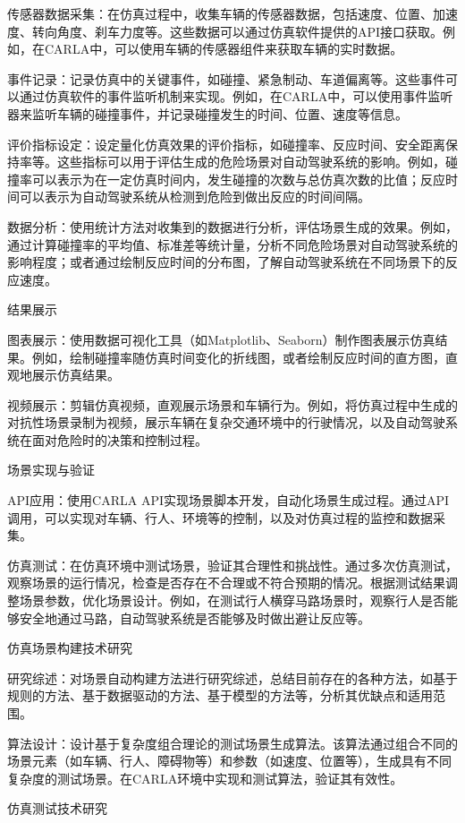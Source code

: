 传感器数据采集：在仿真过程中，收集车辆的传感器数据，包括速度、位置、加速度、转向角度、刹车力度等。这些数据可以通过仿真软件提供的API接口获取。例如，在CARLA中，可以使用车辆的传感器组件来获取车辆的实时数据。

事件记录：记录仿真中的关键事件，如碰撞、紧急制动、车道偏离等。这些事件可以通过仿真软件的事件监听机制来实现。例如，在CARLA中，可以使用事件监听器来监听车辆的碰撞事件，并记录碰撞发生的时间、位置、速度等信息。

评价指标设定：设定量化仿真效果的评价指标，如碰撞率、反应时间、安全距离保持率等。这些指标可以用于评估生成的危险场景对自动驾驶系统的影响。例如，碰撞率可以表示为在一定仿真时间内，发生碰撞的次数与总仿真次数的比值；反应时间可以表示为自动驾驶系统从检测到危险到做出反应的时间间隔。

数据分析：使用统计方法对收集到的数据进行分析，评估场景生成的效果。例如，通过计算碰撞率的平均值、标准差等统计量，分析不同危险场景对自动驾驶系统的影响程度；或者通过绘制反应时间的分布图，了解自动驾驶系统在不同场景下的反应速度。

结果展示

图表展示：使用数据可视化工具（如Matplotlib、Seaborn）制作图表展示仿真结果。例如，绘制碰撞率随仿真时间变化的折线图，或者绘制反应时间的直方图，直观地展示仿真结果。

视频展示：剪辑仿真视频，直观展示场景和车辆行为。例如，将仿真过程中生成的对抗性场景录制为视频，展示车辆在复杂交通环境中的行驶情况，以及自动驾驶系统在面对危险时的决策和控制过程。

场景实现与验证

API应用：使用CARLA API实现场景脚本开发，自动化场景生成过程。通过API调用，可以实现对车辆、行人、环境等的控制，以及对仿真过程的监控和数据采集。

仿真测试：在仿真环境中测试场景，验证其合理性和挑战性。通过多次仿真测试，观察场景的运行情况，检查是否存在不合理或不符合预期的情况。根据测试结果调整场景参数，优化场景设计。例如，在测试行人横穿马路场景时，观察行人是否能够安全地通过马路，自动驾驶系统是否能够及时做出避让反应等。

仿真场景构建技术研究

研究综述：对场景自动构建方法进行研究综述，总结目前存在的各种方法，如基于规则的方法、基于数据驱动的方法、基于模型的方法等，分析其优缺点和适用范围。

算法设计：设计基于复杂度组合理论的测试场景生成算法。该算法通过组合不同的场景元素（如车辆、行人、障碍物等）和参数（如速度、位置等），生成具有不同复杂度的测试场景。在CARLA环境中实现和测试算法，验证其有效性。

仿真测试技术研究

